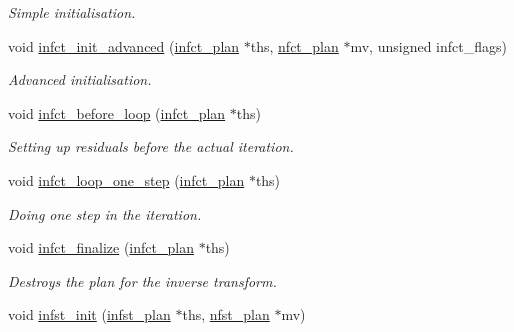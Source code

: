 \begin{CompactItemize}
\begin{CompactList}\small\item\em Simple initialisation. \item\end{CompactList}\item 
\hypertarget{group__solver_ga6}{
void \hyperlink{group__solver_ga6}{infct\_\-init\_\-advanced} (\hyperlink{structinfct__plan}{infct\_\-plan} $\ast$ths, \hyperlink{structnfct__plan}{nfct\_\-plan} $\ast$mv, unsigned infct\_\-flags)}
\label{group__solver_ga6}

\begin{CompactList}\small\item\em Advanced initialisation. \item\end{CompactList}\item 
\hypertarget{group__solver_ga7}{
void \hyperlink{group__solver_ga7}{infct\_\-before\_\-loop} (\hyperlink{structinfct__plan}{infct\_\-plan} $\ast$ths)}
\label{group__solver_ga7}

\begin{CompactList}\small\item\em Setting up residuals before the actual iteration. \item\end{CompactList}\item 
\hypertarget{group__solver_ga8}{
void \hyperlink{group__solver_ga8}{infct\_\-loop\_\-one\_\-step} (\hyperlink{structinfct__plan}{infct\_\-plan} $\ast$ths)}
\label{group__solver_ga8}

\begin{CompactList}\small\item\em Doing one step in the iteration. \item\end{CompactList}\item 
\hypertarget{group__solver_ga9}{
void \hyperlink{group__solver_ga9}{infct\_\-finalize} (\hyperlink{structinfct__plan}{infct\_\-plan} $\ast$ths)}
\label{group__solver_ga9}

\begin{CompactList}\small\item\em Destroys the plan for the inverse transform. \item\end{CompactList}\item 
\hypertarget{group__solver_ga10}{
void \hyperlink{group__solver_ga10}{infst\_\-init} (\hyperlink{structinfst__plan}{infst\_\-plan} $\ast$ths, \hyperlink{structnfst__plan}{nfst\_\-plan} $\ast$mv)}
\label{group__solver_ga10}


\end{CompactItemize}
